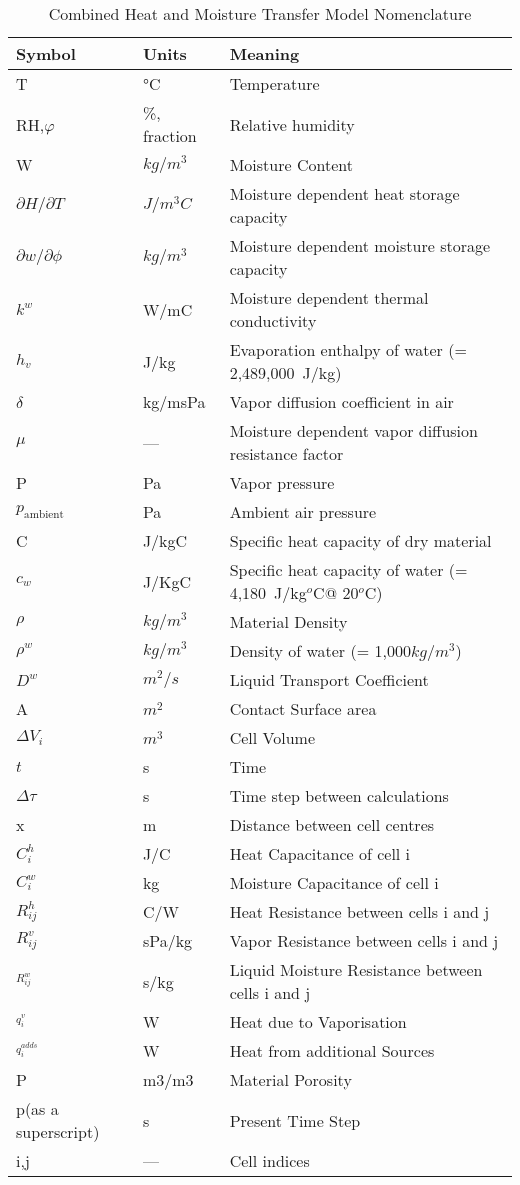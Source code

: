 \begin{longtable}[c]{p{1.5in}p{1.0in}p{3.5in}}
\caption{Combined Heat and Moisture Transfer Model Nomenclature \label{table:combined-heat-and-moisture-transfer-model}}\\
\toprule 
Symbol & Units & Meaning \tabularnewline \midrule \endhead
T & °C & Temperature \tabularnewline \midrule
RH,$\varphi$ & \%, fraction & Relative humidity \tabularnewline \midrule
W & $kg/m^3$ & Moisture Content \tabularnewline \midrule
$\partial{H}/\partial{T}$ & $J/m^3C$ & Moisture dependent heat storage capacity \tabularnewline \midrule
$\partial{w}/\partial{\phi}$ & $kg/m^3$ & Moisture dependent moisture storage capacity \tabularnewline \midrule
${k^w}$ & W/mC & Moisture dependent thermal conductivity \tabularnewline \midrule
${h_v}$ & J/kg & Evaporation enthalpy of water (= 2,489,000~J/kg) \tabularnewline \midrule
$\delta$ & kg/msPa & Vapor diffusion coefficient in air \tabularnewline \midrule
$\mu$ & --- & Moisture dependent vapor diffusion resistance factor \tabularnewline \midrule
P & Pa & Vapor pressure \tabularnewline \midrule
$p_{\text{ambient}}$ & Pa & Ambient air pressure \tabularnewline \midrule
C & J/kgC & Specific heat capacity of dry material \tabularnewline \midrule
$c_{w}$ & J/KgC & Specific heat capacity of water (= 4,180~J/kg$^{o}$C@ 20$^{o}$C) \tabularnewline \midrule
$\rho$ & $kg/m^3$ & Material Density \tabularnewline \midrule
${\rho ^w}$ & $kg/m^3$ & Density of water (= 1,000$kg/m^3$) \tabularnewline \midrule
${D^w}$ & $m^2/s$ & Liquid Transport Coefficient \tabularnewline \midrule
A & $m^2$ & Contact Surface area \tabularnewline \midrule
$\Delta {V_i}$ & $m^3$ & Cell Volume \tabularnewline \midrule
$t$ & s & Time \tabularnewline \midrule
$\Delta \tau$ & s & Time step between calculations \tabularnewline \midrule
x & m & Distance between cell centres \tabularnewline \midrule
$C_i^h$ & J/C & Heat Capacitance of cell i \tabularnewline \midrule
$C_i^w$ & kg & Moisture Capacitance of cell i \tabularnewline \midrule
$R_{ij}^h$ & C/W & Heat Resistance between cells i and j \tabularnewline \midrule
$R_{ij}^v$ & sPa/kg & Vapor Resistance between cells i and j \tabularnewline \midrule
$^{R_{ij}^w}$ & s/kg & Liquid Moisture Resistance between cells i and j \tabularnewline \midrule
$^{q_i^v}$ & W & Heat due to Vaporisation \tabularnewline \midrule
$^{q_i^{adds}}$ & W & Heat from additional Sources \tabularnewline \midrule
P & m3/m3 & Material Porosity \tabularnewline \midrule
p(as a superscript) & s & Present Time Step \tabularnewline \midrule
i,j & --- & Cell indices \tabularnewline
\bottomrule
\end{longtable}


